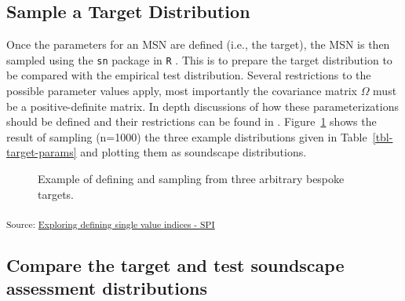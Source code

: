 \documentclass[
  authoryear,
  3p]{elsarticle}
\begin{document}
\subsection{Sample a Target
Distribution}\label{sec-sample-a-target-distribution}

Once the parameters for an MSN are defined (i.e., the target), the MSN
is then sampled using the \texttt{sn} package \citep{Azzalini2021R} in
\texttt{R} \citep{RCT2018R}. This is to prepare the target distribution
to be compared with the empirical test distribution. Several
restrictions to the possible parameter values apply, most importantly
the covariance matrix \(\Omega\) must be a positive-definite matrix. In
depth discussions of how these parameterizations should be defined and
their restrictions can be found in \citet{Azzalini2016How}.
Figure~\ref{fig-tgts} shows the result of sampling (n=1000) the three
example distributions given in Table~\ref{tbl-target-params} and
plotting them as soundscape distributions.

\begin{figure}[H]


\caption{\label{fig-tgts}Example of defining and sampling from three
arbitrary bespoke targets.}

\end{figure}%

\textsubscript{Source:
\href{https://MitchellAcoustics.github.io/J2401_JASA_SSID-Single-Index/notebooks/SingleIndex-Code-preview.html\#cell-fig-tgts}{Exploring
defining single value indices - SPI }}

\subsection{Compare the target and test soundscape assessment
distributions}\label{compare-the-target-and-test-soundscape-assessment-distributions}
\end{document}
